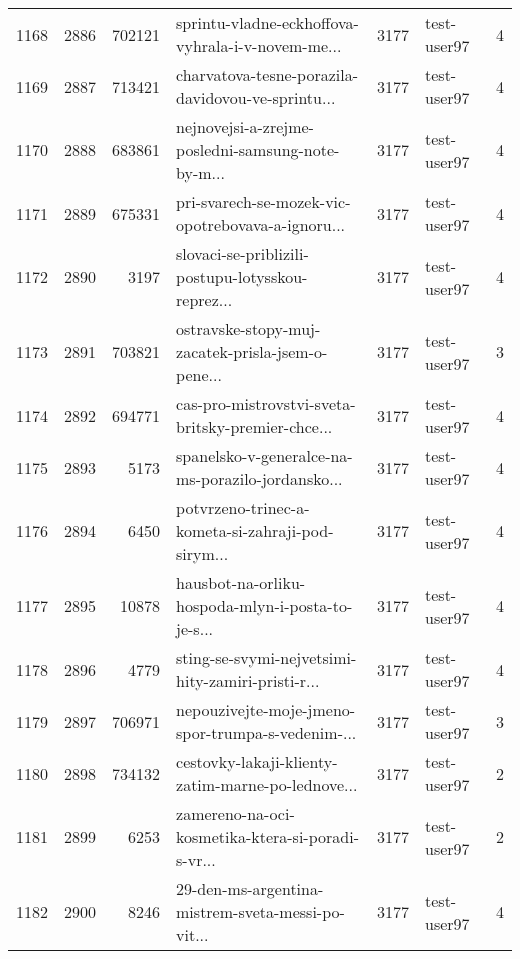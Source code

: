 \begin{tabular}{lrrlrlr}
1168 &       2886 &   702121 &  sprintu-vladne-eckhoffova-vyhrala-i-v-novem-me... &     3177 &                  test-user97 &               4 \\
1169 &       2887 &   713421 &  charvatova-tesne-porazila-davidovou-ve-sprintu... &     3177 &                  test-user97 &               4 \\
1170 &       2888 &   683861 &  nejnovejsi-a-zrejme-posledni-samsung-note-by-m... &     3177 &                  test-user97 &               4 \\
1171 &       2889 &   675331 &  pri-svarech-se-mozek-vic-opotrebovava-a-ignoru... &     3177 &                  test-user97 &               4 \\
1172 &       2890 &     3197 &  slovaci-se-priblizili-postupu-lotysskou-reprez... &     3177 &                  test-user97 &               4 \\
1173 &       2891 &   703821 &  ostravske-stopy-muj-zacatek-prisla-jsem-o-pene... &     3177 &                  test-user97 &               3 \\
1174 &       2892 &   694771 &  cas-pro-mistrovstvi-sveta-britsky-premier-chce... &     3177 &                  test-user97 &               4 \\
1175 &       2893 &     5173 &  spanelsko-v-generalce-na-ms-porazilo-jordansko... &     3177 &                  test-user97 &               4 \\
1176 &       2894 &     6450 &  potvrzeno-trinec-a-kometa-si-zahraji-pod-sirym... &     3177 &                  test-user97 &               4 \\
1177 &       2895 &    10878 &  hausbot-na-orliku-hospoda-mlyn-i-posta-to-je-s... &     3177 &                  test-user97 &               4 \\
1178 &       2896 &     4779 &  sting-se-svymi-nejvetsimi-hity-zamiri-pristi-r... &     3177 &                  test-user97 &               4 \\
1179 &       2897 &   706971 &  nepouzivejte-moje-jmeno-spor-trumpa-s-vedenim-... &     3177 &                  test-user97 &               3 \\
1180 &       2898 &   734132 &  cestovky-lakaji-klienty-zatim-marne-po-lednove... &     3177 &                  test-user97 &               2 \\
1181 &       2899 &     6253 &  zamereno-na-oci-kosmetika-ktera-si-poradi-s-vr... &     3177 &                  test-user97 &               2 \\
1182 &       2900 &     8246 &  29-den-ms-argentina-mistrem-sveta-messi-po-vit... &     3177 &                  test-user97 &               4 \\

\end{tabular}
